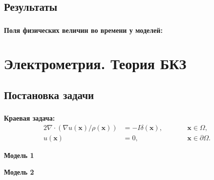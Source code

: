 
\subsection{Результаты}

\begin{frame}
\frametitle{\insertsection}
\framesubtitle{\insertsubsection}

\textbf{Поля физических величин во времени у моделей:}

\hspace{-0.9cm}
\begin{minipage}[t]{0.5\linewidth}
\end{minipage}
\hfill
\begin{minipage}[t]{0.5\linewidth}
\end{minipage}
\end{frame}


\section{Электрометрия. Теория БКЗ}


\subsection{Постановка задачи}

\begin{frame}
\frametitle{\insertsection}
\framesubtitle{\insertsubsection}

\textbf{Краевая задача:}
\begin{alignat*}{2}
\nabla \cdot (\nabla u(\bm x) / \rho(\bm x)) &= -I \delta(\bm x),\qquad && \bm x \in \varOmega, \\
u(\bm x) &= 0, && \bm x \in \partial \varOmega.
\end{alignat*}

\begin{minipage}[t]{0.47\linewidth}
    \textbf{Модель 1}
\end{minipage}
\hfill
\begin{minipage}[t]{0.47\linewidth}
    \textbf{Модель 2}
\end{minipage}
\end{frame}

